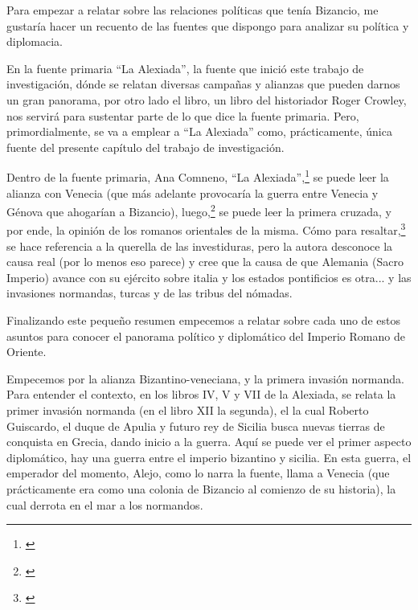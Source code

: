 Para empezar a relatar sobre las relaciones políticas que tenía Bizancio,
me gustaría hacer un recuento de las fuentes que dispongo para analizar
su política y diplomacia.

En la fuente primaria “La Alexiada”, 
la fuente que inició este trabajo de investigación, 
dónde se relatan diversas campañas y alianzas 
que pueden darnos un gran panorama, 
por otro lado el libro, un libro del historiador Roger Crowley, 
nos servirá para sustentar parte de lo que dice la fuente primaria. 
Pero, primordialmente, 
se va a emplear a “La Alexiada” como, prácticamente, 
única fuente del presente capítulo del trabajo de investigación.

Dentro de la fuente primaria,  Ana Comneno, “La Alexiada”,\footnote{\cite[]{alexiadaVI}}
se puede leer la alianza con Venecia (que más adelante provocaría 
la guerra entre Venecia y Génova que ahogarían a Bizancio), luego,\footnote{\cite[pp.~419--460]{alexiadaX}}
se puede leer la 
primera cruzada, y por ende, la opinión de los romanos 
orientales de la misma. Cómo para resaltar,\footnote{\cite[]{alexiadaV}}
se hace referencia a la querella de las investiduras, 
pero la autora desconoce la causa real (por lo menos eso parece) 
y cree que la causa de que Alemania (Sacro Imperio)
avance con su ejército sobre italia y los estados
pontificios es otra...
y las invasiones normandas, 
turcas y de las tribus del nómadas. 

Finalizando este pequeño resumen empecemos a 
relatar sobre cada uno de estos asuntos para conocer el 
panorama político y diplomático del Imperio Romano de Oriente.

Empecemos por la alianza Bizantino-veneciana, y la primera 
invasión normanda. Para entender el contexto, en los libros 
IV, V y VII de la Alexiada, se relata la primer invasión normanda 
(en el libro XII la segunda), el la cual Roberto Guiscardo, 
el duque de Apulia y futuro rey de Sicilia busca nuevas tierras de 
conquista en Grecia, dando inicio a la guerra. Aquí se puede ver el 
primer aspecto diplomático, hay una guerra entre el imperio bizantino 
y sicilia. En esta guerra, el emperador del momento, Alejo, 
como lo narra la fuente, llama a Venecia (que prácticamente 
era como una colonia de Bizancio al comienzo de su historia), 
la cual derrota en el mar a los normandos.

